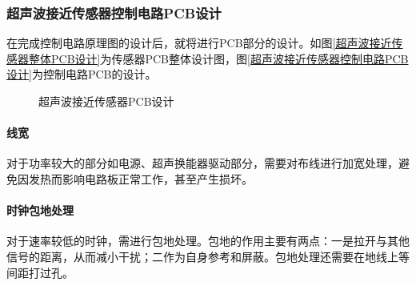 \subsubsection{超声波接近传感器控制电路PCB设计}
在完成控制电路原理图的设计后，就将进行PCB部分的设计。如图\ref{超声波接近传感器整体PCB设计}为传感器PCB整体设计图，图\ref{超声波接近传感器控制电路PCB设计}为控制电路PCB的设计。
\begin{figure}[ht]
	\centering
	\caption{超声波接近传感器PCB设计}
	\label{超声波接近传感器PCB设计}
\end{figure}
\paragraph{线宽}
对于功率较大的部分如电源、超声换能器驱动部分，需要对布线进行加宽处理，避免因发热而影响电路板正常工作，甚至产生损坏。\par
\paragraph{时钟包地处理}
对于速率较低的时钟，需进行包地处理。包地的作用主要有两点：一是拉开与其他信号的距离，从而减小干扰；二作为自身参考和屏蔽。包地处理还需要在地线上等间距打过孔。

